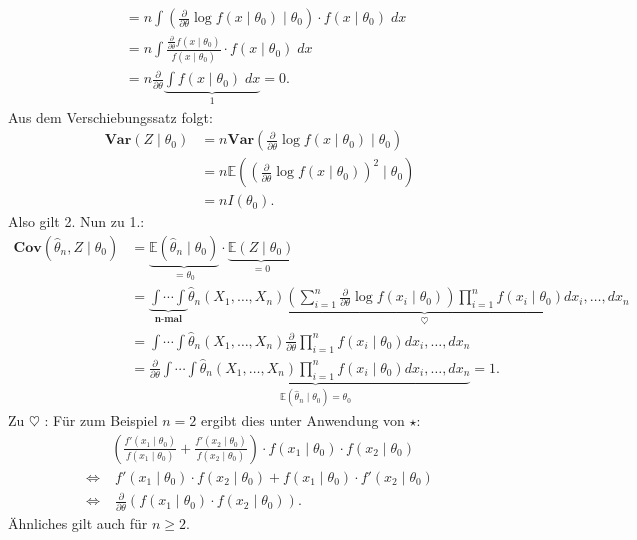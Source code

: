 \documentclass[10pt]{article}
\newcommand{\FZV}{X_1, \ldots, X_n} %
\newcommand{\EW}{\mathbb{E}} %
\newcommand{\ablt}{\frac{\partial}{\partial \theta}}
\newenvironment{BWS}[1][]
{\begin{Beweis}[frametitle=#1]}{\end{Beweis}}
\begin{document}
\begin{BWS}[Beweis 1.4.1 (Cramér-Rao-Schranke)]
\begin{equation*}
\begin{split}
				&= n \int \left(\ablt \log f(x \mid \theta_0)\mid \theta_0\right) \cdot f(x \mid \theta_0) \; dx\\
				&= n \int \frac{\ablt f(x \mid \theta_0)}{f(x \mid \theta_0)} \cdot f(x \mid \theta_0) \; dx\\
				&= n \ablt \underbrace{\int f(x \mid \theta_0) \; dx}_{1} = 0.
			\end{split}
		\end{equation*}
		Aus dem Verschiebungssatz folgt:
		\begin{equation*}
			\begin{split}
				\textbf{Var}(Z \mid \theta_0) &= n \textbf{Var}\left(\ablt \log f(x \mid \theta_0)\mid \theta_0 \right)\\
				&= n\EW\left(\left(\ablt \log f(x \mid \theta_0)\right)^2 \mid \theta_0\right)\\
				&= nI(\theta_0).
			\end{split}
		\end{equation*}
		Also gilt 2. Nun zu 1.:
		\begin{equation*}
			\begin{split}
				\textbf{Cov}(\hat{\theta}_n, Z \mid \theta_0) &= \underbrace{\EW(\hat{\theta}_n \mid \theta_0)}_{= \theta_0} \cdot \underbrace{\EW(Z \mid \theta_0)}_{= 0}\\
				&= \underbrace{\int \cdots \int}_{\textbf{n-mal}}\hat{\theta}_n(\FZV) \underbrace{(\sum_{i=1}^{n}\ablt \log f(x_i \mid \theta_0)) \prod_{i=1}^{n}f(x_i \mid \theta_0)}_{\heartsuit} dx_i, \ldots, dx_n\\
				&= \int \cdots \int \hat{\theta}_n (\FZV) \ablt \prod_{i=1}^{n} f(x_i \mid \theta_0) dx_i, \ldots, dx_n\\
				&= \ablt \underbrace{\int \cdots \int \hat{\theta}_n(\FZV) \prod_{i=1}^{n} f(x_i \mid \theta_0) dx_i, \ldots, dx_n}_{\EW(\hat{\theta}_n \mid \theta_0) = \theta_0} = 1.
			\end{split}
		\end{equation*}
		Zu $\heartsuit$ : Für zum Beispiel $n=2$ ergibt dies unter Anwendung von $\star$:
		\begin{equation*}
			\begin{split}
				&\left(\frac{f'(x_1 \mid \theta_0)}{f(x_1 \mid \theta_0)} + \frac{f'(x_2 \mid \theta_0)}{f(x_2 \mid \theta_0)}\right) \cdot f(x_1 \mid \theta_0) \cdot f(x_2 \mid \theta_0)\\
				\Leftrightarrow & \;f'(x_1 \mid \theta_0) \cdot f(x_2 \mid \theta_0) + f(x_1 \mid \theta_0) \cdot f'(x_2 \mid \theta_0)\\
				\Leftrightarrow & \;\ablt (f(x_1 \mid \theta_0) \cdot f(x_2 \mid \theta_0)).
			\end{split}
		\end{equation*}
		Ähnliches gilt auch für $n \geq 2$.
	\end{BWS}
	
\end{document}
